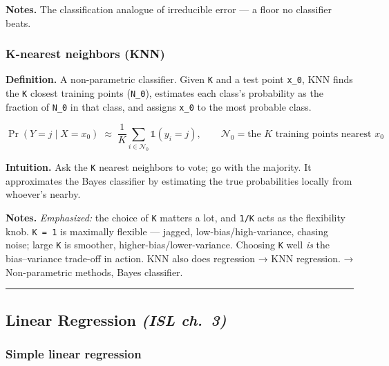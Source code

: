 \documentclass[
  10pt,
  letterpaper,
  onecolumn]{article}
\begin{document}
\textbf{Notes.} The classification analogue of irreducible error --- a
floor no classifier beats.

\hypertarget{k-nearest-neighbors-knn}{%
\subsubsection{K-nearest neighbors
(KNN)}\label{k-nearest-neighbors-knn}}

\textbf{Definition.} A non-parametric classifier. Given \texttt{K} and a
test point \texttt{x\_0}, KNN finds the \texttt{K} closest training
points (\texttt{N\_0}), estimates each class's probability as the
fraction of \texttt{N\_0} in that class, and assigns \texttt{x\_0} to
the most probable class.

\begin{equation*}
\Pr(Y=j\mid X=x_0)\;\approx\;\frac{1}{K}\sum_{i\in\mathcal{N}_0}\mathbb{1}(y_i=j),
\qquad \mathcal{N}_0=\text{the }K\text{ training points nearest }x_0
\end{equation*}

\textbf{Intuition.} Ask the \texttt{K} nearest neighbors to vote; go
with the majority. It approximates the Bayes classifier by estimating
the true probabilities locally from whoever's nearby.

\textbf{Notes.} \emph{Emphasized:} the choice of \texttt{K} matters a
lot, and \texttt{1/K} acts as the flexibility knob. \texttt{K\ =\ 1} is
maximally flexible --- jagged, low-bias/high-variance, chasing noise;
large \texttt{K} is smoother, higher-bias/lower-variance. Choosing
\texttt{K} well \emph{is} the bias--variance trade-off in action. KNN
also does regression → KNN regression. → Non-parametric methods, Bayes
classifier.

\begin{center}\rule{0.5\linewidth}{0.5pt}\end{center}

\hypertarget{linear-regression-isl-ch.-3}{%
\subsection{\texorpdfstring{Linear Regression \emph{(ISL
ch.~3)}}{Linear Regression (ISL ch.~3)}}\label{linear-regression-isl-ch.-3}}

\hypertarget{simple-linear-regression}{%
\subsubsection{Simple linear
regression}\label{simple-linear-regression}}
\end{document}
